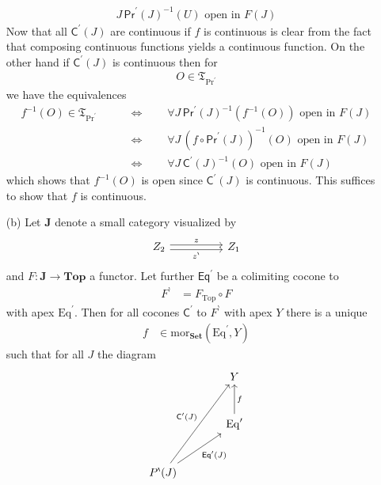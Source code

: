 \begin{prf}
\begin{enumerate}
\begin{align*}
  J
  \,
  \mathsf{Pr}^{\prime}(J)^{-1}
  (U)
  \text{ open in }
  F(J)
\end{align*}
Now that all $\mathsf{C}^{\prime}(J)$ are continuous if $f$ is continuous is clear from the fact that composing continuous functions yields a continuous function.
On the other hand if $\mathsf{C}^{\prime}(J)$ is continuous then for
\begin{align*}
  O
  \in
  \mathfrak{T}_{\mathrm{Pr}^{\prime}}
\end{align*}
we have the equivalences
\begin{align*}
  f^{-1}(O)
  \in
  \mathfrak{T}_{\mathrm{Pr}^{\prime}}
  \qquad
  &\Leftrightarrow
  \qquad
  \forall
  J
  \,
  \mathsf{Pr}^{\prime}(J)^{-1}
  \left(
    f^{-1}(O)
  \right)
  \text{ open in }
  F(J)
  \\
  &\Leftrightarrow
  \qquad
  \forall
  J
  \,
  \left(
    f
    \circ
    \mathsf{Pr}^{\prime}(J)
  \right)^{-1}
  (O)
  \text{ open in }
  F(J)
  \\
  &\Leftrightarrow
  \qquad
  \forall
  J
  \,
  \mathsf{C}^{\prime}(J)^{-1}
  (O)
  \text{ open in }
  F(J)
\end{align*}
which shows that $f^{-1}(O)$ is open since $\mathsf{C}^{\prime}(J)$ is continuous.
This suffices to show that $f$ is continuous.
\item[(b)]
Let $\mathbf{J}$ denote a small category visualized by
\[
\begin{tikzcd}[sep=huge]
  Z_{2}
  \arrow[shift left=0.5ex]{r}{z}
  \arrow[swap,shift right=0.5ex]{r}{z^{\backprime}}
  &
  Z_{1}
\end{tikzcd}
\]
and $F \colon \mathbf{J} \rightarrow \mathbf{Top}$ a functor.
Let further $\mathsf{Eq}^{\prime}$ be a colimiting cocone to
\begin{align*}
  F^{\backprime}
  &=
  F_{\mathrm{Top}}
  \circ
  F
\end{align*}
with apex $\mathrm{Eq}^{\prime}$.
Then for all cocones $\mathsf{C}^{\prime}$ to $F^{\backprime}$ with apex $Y$ there is a unique
\begin{align*}
  f
  &\in
  \mathrm{mor}_{\mathbf{Set}}
  \left(
    \mathrm{Eq}^{\prime},
    Y
  \right)
\end{align*}
such that for all $J$ the diagram
\[
\begin{tikzcd}[sep=large]
  &
  Y
  \\
  &
  \mathrm{Eq}^{\prime}
  \arrow[swap]{u}{f}
  \\
  P^{\backprime}(J)
  \arrow{uur}{\mathsf{C}^{\prime}(J)}
  \arrow[swap]{ur}{\mathsf{Eq}^{\prime}(J)}

\end{tikzcd}\]
\end{enumerate}
\end{prf}
